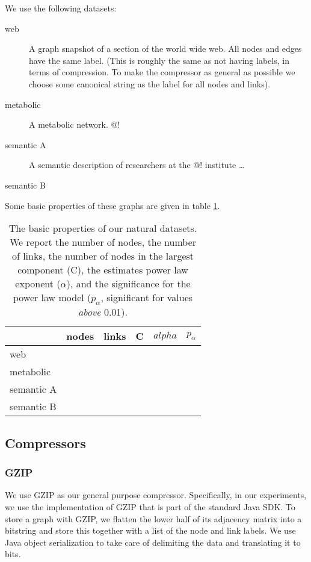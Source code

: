 \documentclass[10pt,a4paper,oneside]{article}
\begin{document}
We use the following datasets:
\begin{description}
	\item[web] A graph snapshot of a section of the world wide web. All nodes and edges have the same label. (This is roughly the same as not having labels, in terms of compression. To make the compressor as general as possible we choose some canonical string as the label for all nodes and links).
	\item[metabolic] A metabolic network. @!
	\item[semantic A] A semantic description of researchers at the @! institute \ldots 
	\item[semantic B]
\end{description}

Some basic properties of these graphs are given in table \ref{table:properties}.

\begin{table}
\label{table:properties}
\begin{tabular}{ l | r r r r r}
\hline
    & nodes & links & C & $alpha$ & $p_\alpha$ \\
\hline
  web & & & & & \\
  metabolic & & & & & \\
  semantic A & & & & & \\
  semantic B & & & & & \\
  
\hline
\end{tabular}
\caption{The basic properties of our natural datasets. We report the number of nodes, the number of links, the number of nodes in the largest component (C), the estimates power law exponent ($\alpha$), and the significance for the power law model ($p_\alpha$, significant for values \emph{above} 0.01).}

\end{table}

\subsection*{Compressors}

\subsubsection*{GZIP}

We use GZIP as our general purpose compressor. Specifically, in our experiments, we use the implementation of GZIP that is part of the standard Java SDK. To store a graph with GZIP, we flatten the lower half of its adjacency matrix into a bitstring and store this together with a list of the node and link labels. We use Java object serialization to take care of delimiting the data and translating it to bits.   
\end{document}
